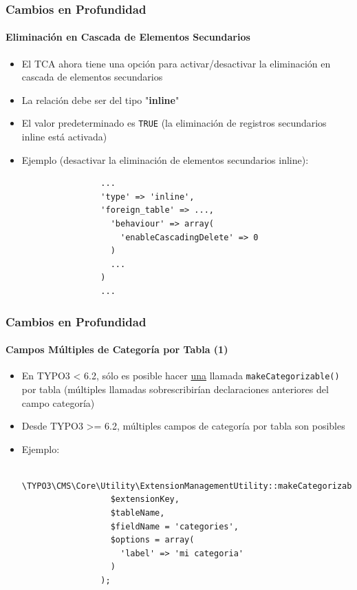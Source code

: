 
\begin{frame}[fragile]
	\frametitle{Cambios en Profundidad}
	\framesubtitle{Eliminación en Cascada de Elementos Secundarios}

	\begin{itemize}
		\item El TCA ahora tiene una opción para activar/desactivar la eliminación en cascada de elementos secundarios
		\item La relación debe ser del tipo "\textbf{inline}"
		\item El valor predeterminado es \texttt{TRUE} (la eliminación de registros secundarios inline está activada)
		\item Ejemplo (desactivar la eliminación de elementos secundarios inline):

			\begin{lstlisting}
				...
				'type' => 'inline',
				'foreign_table' => ...,
				  'behaviour' => array(
				    'enableCascadingDelete' => 0
				  )
				  ...
				)
				...
			\end{lstlisting}

	\end{itemize}

\end{frame}


\begin{frame}[fragile]
	\frametitle{Cambios en Profundidad}
	\framesubtitle{Campos Múltiples de Categoría por Tabla (1)}

	\begin{itemize}
		\item En TYPO3 < 6.2, sólo es posible hacer \underline{una} llamada \texttt{makeCategorizable()} por tabla
			(múltiples llamadas sobrescribirían declaraciones anteriores del campo categoría)
		\item Desde TYPO3 >= 6.2, múltiples campos de categoría por tabla son posibles
		\item Ejemplo:

			\begin{lstlisting}
				\TYPO3\CMS\Core\Utility\ExtensionManagementUtility::makeCategorizable(
				  $extensionKey,
				  $tableName,
				  $fieldName = 'categories',
				  $options = array(
				  	'label' => 'mi categoria'
				  )
				);
			\end{lstlisting}
	\end{itemize}

\end{frame}

